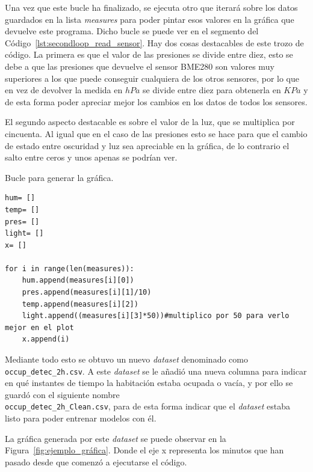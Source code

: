 \documentclass[a4paper, 12pt]{book}
\begin{document}
Una vez que este bucle ha finalizado, se ejecuta otro que iterará sobre los datos guardados en la lista \textit{measures} para poder pintar esos valores en la gráfica que devuelve este programa. Dicho bucle se puede ver en el segmento del Código~\ref{lst:secondloop_read_sensor}. Hay dos cosas destacables de este trozo de código. La primera es que el valor de las presiones se divide entre diez, esto se debe a que las presiones que devuelve el sensor BME280 son valores muy superiores a los que puede conseguir cualquiera de los otros sensores, por lo que en vez de devolver la medida en $hPa$ se divide entre diez para obtenerla en $KPa$ y de esta forma poder apreciar mejor los cambios en los datos de todos los sensores.

El segundo aspecto destacable es sobre el valor de la luz, que se multiplica por cincuenta. Al igual que en el caso de las presiones esto se hace para que el cambio de estado entre oscuridad y luz sea apreciable en la gráfica, de lo contrario el salto entre ceros y unos apenas se podrían ver.

\begin{listing}[]
    \caption{Bucle para generar la gráfica.}{}
    \label{lst:secondloop_read_sensor}
    \begin{verbatim}
hum= []
temp= []
pres= []
light= []
x= []

for i in range(len(measures)):
    hum.append(measures[i][0])
    pres.append(measures[i][1]/10)
    temp.append(measures[i][2])
    light.append((measures[i][3]*50))#multiplico por 50 para verlo mejor en el plot
    x.append(i)
    \end{verbatim}
\end{listing}

Mediante todo esto se obtuvo un nuevo \textit{dataset} denominado como \texttt{occup\_detec\_2h.csv}. A este \textit{dataset} se le añadió una nueva columna para indicar en qué instantes de tiempo la habitación estaba ocupada o vacía, y por ello se guardó con el siguiente nombre \\\texttt{occup\_detec\_2h\_Clean.csv}, para de esta forma indicar que el \textit{dataset} estaba listo para poder entrenar modelos con él.

La gráfica generada por este \textit{dataset} se puede observar en la Figura~\ref{fig:ejemplo_gráfica}. Donde el eje x representa los minutos que han pasado desde que comenzó a ejecutarse el código.
\end{document}
